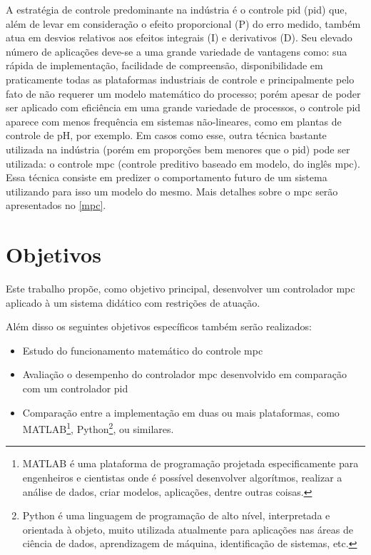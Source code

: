 A estratégia de controle predominante na indústria é o controle \acrshort{pid} (\acrlong{pid}) que, além de levar em consideração o efeito proporcional (P) do erro medido, também atua em desvios relativos aos efeitos integrais (I) e derivativos (D). Seu elevado número de aplicações deve-se a uma grande variedade de vantagens como: sua rápida de implementação, facilidade de compreensão, disponibilidade em praticamente todas as plataformas industriais de controle e principalmente pelo fato de não requerer um modelo matemático do processo; porém apesar de poder ser aplicado com eficiência em uma grande variedade de processos, o controle \acrshort{pid} aparece com menos frequência em sistemas não-lineares, como em plantas de controle de pH, por exemplo. Em casos como esse, outra técnica bastante utilizada na indústria (porém em proporções bem menores que o \acrshort{pid}) pode ser utilizada: o controle \acrshort{mpc} (controle preditivo baseado em modelo, do inglês \acrlong{mpc}). Essa técnica consiste em predizer o comportamento futuro de um sistema utilizando para isso um modelo do mesmo. Mais detalhes sobre o \acrshort{mpc} serão apresentados no \autoref{mpc}.

\section{Objetivos}

Este trabalho propõe, como objetivo principal, desenvolver um controlador \acrshort{mpc} aplicado à um sistema didático com restrições de atuação.

Além disso os seguintes objetivos específicos também serão realizados:
\begin{itemize}
\item Estudo do funcionamento matemático do controle \acrshort{mpc}
\item Avaliação o desempenho do controlador \acrshort{mpc} desenvolvido em comparação com um controlador \acrshort{pid}
\item Comparação entre a implementação em duas ou mais plataformas, como MATLAB\textsuperscript{\tiny\textregistered}\footnote{MATLAB\textsuperscript{\tiny\textregistered} é uma plataforma de programação projetada especificamente para engenheiros e cientistas onde é possível desenvolver algorítmos, realizar a análise de dados, criar modelos, aplicações, dentre outras coisas.}, Python\footnote{Python é uma linguagem de programação de alto nível, interpretada e orientada à objeto, muito utilizada atualmente para aplicações nas áreas de ciência de dados, aprendizagem de máquina, identificação de sistemas, etc.}, ou similares.
\end{itemize}

